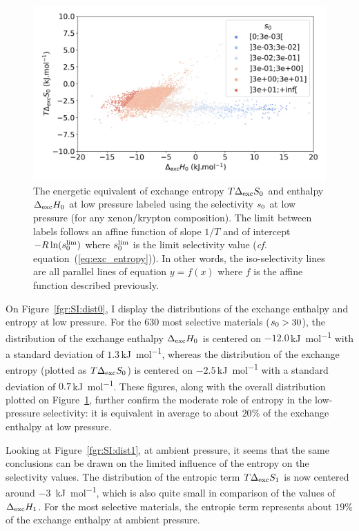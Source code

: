 \documentclass[main.tex]{subfiles}
\begin{document}
\begin{figure}[t]
\centering
  \includegraphics[width=0.6\linewidth]{figures/2-thermo/enthalpy_entropy_0_s_0.jpg}
  \caption{The energetic equivalent of exchange entropy $T\Delta_{\text{exc}}S_{\text{0}}$ and enthalpy $\Delta_{\text{exc}}H_{\text{0}}$ at low pressure labeled using the selectivity $s_{\text{0}}$ at low pressure (for any xenon/krypton composition). The limit between labels follows an affine function of slope $1/T$ and of intercept $-R\ln(s_{\text{0}}^{\text{lim}})$ where $s_{\text{0}}^{\text{lim}}$ is the limit selectivity value (\emph{cf.} equation~(\ref{eq:exc_entropy})). In other words, the iso-selectivity lines are all parallel lines of equation $y=f(x)$ where $f$ is the affine function described previously.}\label{fgr:HSplot_0}
\end{figure}


On Figure~\ref{fgr:SI:dist0}, I display the distributions of the exchange enthalpy and entropy at low pressure. For the 630 most selective materials ($s_{\text{0}} > 30$), the distribution of the exchange enthalpy $\Delta_{\text{exc}}H_{\text{0}}$ is centered on $-12.0$\,\si{\kilo\joule\per\mol} with a standard deviation of $1.3$\,\si{\kilo\joule\per\mol}, whereas the distribution of the exchange entropy (plotted as $T\Delta_{\text{exc}}S_{\text{0}}$) is centered on $-2.5$\,\si{\kilo\joule\per\mol} with a standard deviation of $0.7$\,\si{\kilo\joule\per\mol}. These figures, along with the overall distribution plotted on Figure~\ref{fgr:HSplot_0}, further confirm the moderate role of entropy in the low-pressure selectivity: it is equivalent in average to about {$20$\%} of the exchange enthalpy at low pressure.


Looking at Figure~\ref{fgr:SI:dist1}, at ambient pressure, it seems that the same conclusions can be drawn on the limited influence of the entropy on the selectivity values. The distribution of the entropic term $T\Delta_{\text{exc}}S_{\text{1}}$ is now centered around $-3$~\si{\kilo\joule\per\mole}, which is also quite small in comparison of the values of $\Delta_{\text{exc}}H_{\text{1}}$. For the most selective materials, the entropic term represents about {$19$\%} of the exchange enthalpy at ambient pressure.
\end{document}
